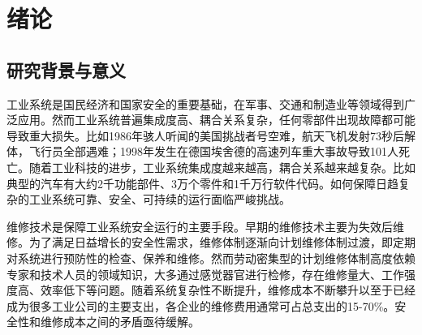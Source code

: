 
\chapter{绪论}
\label{cha:intro}


\section{研究背景与意义}
\label{sec:meaning}

工业系统是国民经济和国家安全的重要基础，在军事、交通和制造业等领域得到广泛应用。然而工业系统普遍集成度高、耦合关系复杂，任何零部件出现故障都可能导致重大损失。比如1986年骇人听闻的美国挑战者号空难，航天飞机发射73秒后解体，飞行员全部遇难\cite{united1986report}；1998年发生在德国埃舍德的高速列车重大事故导致101人死亡\cite{oestern2000facts}。随着工业科技的进步，工业系统集成度越来越高，耦合关系越来越复杂。比如典型的汽车有大约2千功能部件、3万个零件和1千万行软件代码\cite{tsui2015prognostics}。如何保障日趋复杂的工业系统可靠、安全、可持续的运行面临严峻挑战。

维修技术是保障工业系统安全运行的主要手段\cite{jardine2006review}。早期的维修技术主要为失效后维修。为了满足日益增长的安全性需求，维修体制逐渐向计划维修体制过渡，即定期对系统进行预防性的检查、保养和维修。然而劳动密集型的计划维修体制高度依赖专家和技术人员的领域知识，大多通过感觉器官进行检修，存在维修量大、工作强度高、效率低下等问题。随着系统复杂性不断提升，维修成本不断攀升以至于已经成为很多工业公司的主要支出\cite{peng2010current}，各企业的维修费用通常可占总支出的15-70\%\cite{王凌2007维修决策模型和方法的理论与应用研究}。安全性和维修成本之间的矛盾亟待缓解。

